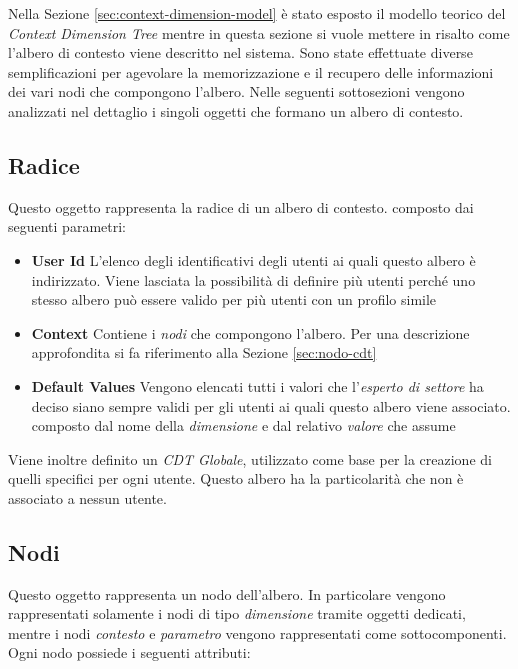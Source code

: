 Nella Sezione \ref{sec:context-dimension-model} è stato esposto il modello teorico del \emph{Context Dimension Tree} mentre in questa sezione si vuole mettere in risalto come l'albero di contesto viene descritto nel sistema. Sono state effettuate diverse semplificazioni per agevolare la memorizzazione e il recupero delle informazioni dei vari nodi che compongono l'albero. Nelle seguenti sottosezioni vengono analizzati nel dettaglio i singoli oggetti che formano un albero di contesto.

\subsection{Radice\label{sec:radice-cdt}}

Questo oggetto rappresenta la radice di un albero di contesto. \upe composto dai seguenti parametri:

\begin{itemize}
	\item \textbf{User Id} L'elenco degli identificativi degli utenti ai quali questo albero è indirizzato. Viene lasciata la possibilità di definire più utenti perché uno stesso albero può essere valido per più utenti con un profilo simile
	\item \textbf{Context} Contiene i \emph{nodi} che compongono l'albero. Per una descrizione approfondita si fa riferimento alla Sezione \ref{sec:nodo-cdt}
	\item \textbf{Default Values} Vengono elencati tutti i valori che l'\emph{esperto di settore} ha deciso siano sempre validi per gli utenti ai quali questo albero viene associato. \upe composto dal nome della \emph{dimensione} e dal relativo \emph{valore} che assume
\end{itemize}

Viene inoltre definito un \emph{CDT Globale}, utilizzato come base per la creazione di quelli specifici per ogni utente. Questo albero ha la particolarità che non è associato a nessun utente.

\subsection{Nodi\label{sec:nodo-cdt}}

Questo oggetto rappresenta un nodo dell'albero. In particolare vengono rappresentati solamente i nodi di tipo \emph{dimensione} tramite oggetti dedicati, mentre i nodi \emph{contesto} e \emph{parametro} vengono rappresentati come sottocomponenti. Ogni nodo possiede i seguenti attributi:

